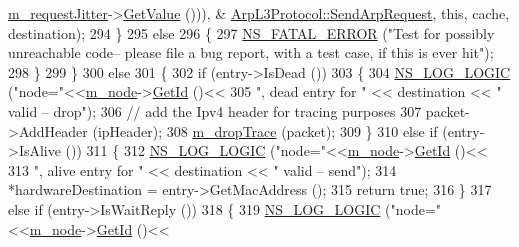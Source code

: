 \begin{DoxyCode}
      \hyperlink{classns3_1_1ArpL3Protocol_a0d5144a236473eb6d7153600fdd7c5ee}{m\_requestJitter}->\hyperlink{classns3_1_1RandomVariableStream_a4fa5944dc4cb11544e661ed23072b36c}{GetValue} ())), &
      \hyperlink{classns3_1_1ArpL3Protocol_a9fe6faf0f82536ba2c14d5bdbf7469db}{ArpL3Protocol::SendArpRequest}, \textcolor{keyword}{this}, cache, destination);
294             \} 
295           \textcolor{keywordflow}{else}
296             \{
297               \hyperlink{group__fatal_ga5131d5e3f75d7d4cbfd706ac456fdc85}{NS\_FATAL\_ERROR} (\textcolor{stringliteral}{"Test for possibly unreachable code-- please file a bug report,
       with a test case, if this is ever hit"});
298             \}
299         \} 
300       \textcolor{keywordflow}{else} 
301         \{
302           \textcolor{keywordflow}{if} (entry->IsDead ()) 
303             \{
304               \hyperlink{group__logging_ga88acd260151caf2db9c0fc84997f45ce}{NS\_LOG\_LOGIC} (\textcolor{stringliteral}{"node="}<<\hyperlink{classns3_1_1ArpL3Protocol_aa1a2d173cfb3fd7e2f8eff8504a114da}{m\_node}->\hyperlink{classns3_1_1Node_aaf49b64a843565ce3812326313b370ac}{GetId} ()<<
305                             \textcolor{stringliteral}{", dead entry for "} << destination << \textcolor{stringliteral}{" valid -- drop"});
306               \textcolor{comment}{// add the Ipv4 header for tracing purposes}
307               packet->AddHeader (ipHeader);
308               \hyperlink{classns3_1_1ArpL3Protocol_ac719ebd2b108a4d342741706669d74ad}{m\_dropTrace} (packet);
309             \} 
310           \textcolor{keywordflow}{else} \textcolor{keywordflow}{if} (entry->IsAlive ()) 
311             \{
312               \hyperlink{group__logging_ga88acd260151caf2db9c0fc84997f45ce}{NS\_LOG\_LOGIC} (\textcolor{stringliteral}{"node="}<<\hyperlink{classns3_1_1ArpL3Protocol_aa1a2d173cfb3fd7e2f8eff8504a114da}{m\_node}->\hyperlink{classns3_1_1Node_aaf49b64a843565ce3812326313b370ac}{GetId} ()<<
313                             \textcolor{stringliteral}{", alive entry for "} << destination << \textcolor{stringliteral}{" valid -- send"});
314               *hardwareDestination = entry->GetMacAddress ();
315               \textcolor{keywordflow}{return} \textcolor{keyword}{true};
316             \} 
317           \textcolor{keywordflow}{else} \textcolor{keywordflow}{if} (entry->IsWaitReply ()) 
318             \{
319               \hyperlink{group__logging_ga88acd260151caf2db9c0fc84997f45ce}{NS\_LOG\_LOGIC} (\textcolor{stringliteral}{"node="}<<\hyperlink{classns3_1_1ArpL3Protocol_aa1a2d173cfb3fd7e2f8eff8504a114da}{m\_node}->\hyperlink{classns3_1_1Node_aaf49b64a843565ce3812326313b370ac}{GetId} ()<<

\end{DoxyCode}
